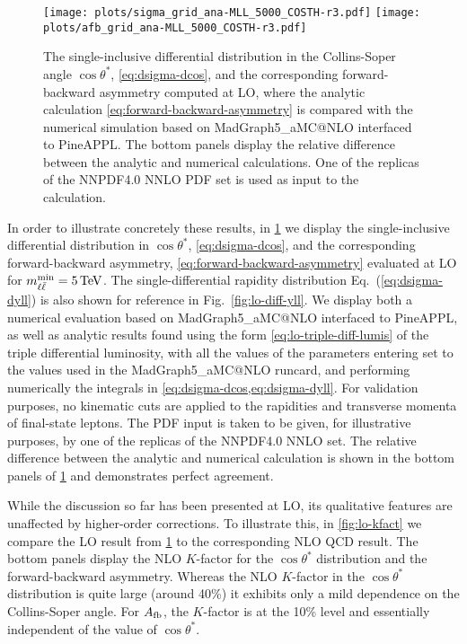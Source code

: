 \begin{figure}[t]
  \centering
  \texttt{[image: plots/sigma\_grid\_ana-MLL\_5000\_COSTH-r3.pdf]}
  \texttt{[image: plots/afb\_grid\_ana-MLL\_5000\_COSTH-r3.pdf]}
  \caption{The single-inclusive differential distribution in
    the Collins-Soper angle $\cos\theta^*$,
    \cref{eq:dsigma-dcos},
    and the corresponding forward-backward asymmetry computed at LO,
    where the analytic calculation  \cref{eq:forward-backward-asymmetry}
    is compared with the numerical simulation based on 
    {\sc\small MadGraph5\_aMC@NLO}
    interfaced to {\sc\small PineAPPL}.
    The bottom panels display the relative difference between the analytic and
    numerical calculations.
    One of the replicas of the NNPDF4.0 NNLO PDF set is used as input
    to the calculation.
  }    
  \label{fig:lo-diff-cos}
\end{figure}

In order to illustrate concretely these results,  
in \cref{fig:lo-diff-cos} we display the
single-inclusive differential distribution in $\cos\theta^*$,
\cref{eq:dsigma-dcos},
and the corresponding forward-backward asymmetry,
\cref{eq:forward-backward-asymmetry} evaluated at LO
for $\mll^{\rm min}=\SI{5}{\TeV}$. The single-differential rapidity
distribution Eq.~(\ref{eq:dsigma-dyll}) is also shown for reference in Fig.~\ref{fig:lo-diff-yll}.
%
We display both a numerical  evaluation based on
 {\sc\small MadGraph5\_aMC@NLO}
interfaced to {\sc\small
  PineAPPL},
as well as analytic results found using the form \cref{eq:lo-triple-diff-lumis} of the triple
differential luminosity, with all the values of the parameters
entering  set to the values used in
the {\sc\small MadGraph5\_aMC@NLO} runcard, and performing  numerically
the integrals in \cref{eq:dsigma-dcos,eq:dsigma-dyll}.
%
For validation purposes, no kinematic cuts are applied to the
rapidities and transverse momenta of final-state leptons.
The PDF input is taken to be given, for illustrative purposes, by
one of the replicas of the NNPDF4.0 NNLO set.
The relative difference between the analytic and
numerical calculation is shown in the bottom panels of
\cref{fig:lo-diff-cos} and demonstrates perfect agreement. 

While the discussion so far has been presented  at LO, its
qualitative features are unaffected by 
higher-order corrections.
%
To illustrate this, in \cref{fig:lo-kfact} we compare
the LO result 
from \cref{fig:lo-diff-cos} to the corresponding NLO QCD result.
%
The bottom panels display the NLO $K$-factor
for the $\cos\theta^*$ distribution
and the forward-backward asymmetry.
%
Whereas the NLO $K$-factor in the
$\cos\theta^*$ distribution is quite large (around 40\%)
it exhibits only a mild dependence on
the Collins-Soper angle.
%
For $A_{\rm fb}$, the $K$-factor is at the 10\% level
and essentially independent of the value of $\cos\theta^*$.

